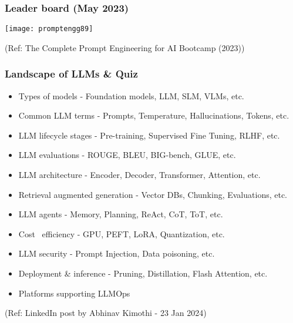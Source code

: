 
\begin{frame}[fragile]\frametitle{Leader board (May 2023)}


		\begin{center}
		\texttt{[image: promptengg89]}

		{\tiny (Ref: The Complete Prompt Engineering for AI Bootcamp (2023))}
		\end{center}	

\end{frame}

\begin{frame}[fragile]\frametitle{Landscape of LLMs \& Quiz}

\begin{itemize}
\item Types of models - Foundation models, LLM, SLM, VLMs, etc.
\item Common LLM terms - Prompts, Temperature, Hallucinations, Tokens, etc.
\item LLM lifecycle stages - Pre-training, Supervised Fine Tuning, RLHF, etc.
\item LLM evaluations - ROUGE, BLEU, BIG-bench, GLUE, etc.
\item LLM architecture - Encoder, Decoder, Transformer, Attention, etc.
\item Retrieval augmented generation - Vector DBs, Chunking, Evaluations, etc.
\item LLM agents - Memory, Planning, ReAct, CoT, ToT, etc.
\item Cost \ efficiency - GPU, PEFT, LoRA, Quantization, etc.
\item LLM security - Prompt Injection, Data poisoning, etc.
\item Deployment \& inference - Pruning, Distillation, Flash Attention, etc.
\item Platforms supporting LLMOps
\end{itemize}	 

{\tiny (Ref: LinkedIn post by Abhinav Kimothi - 23 Jan 2024)}
\end{frame}


